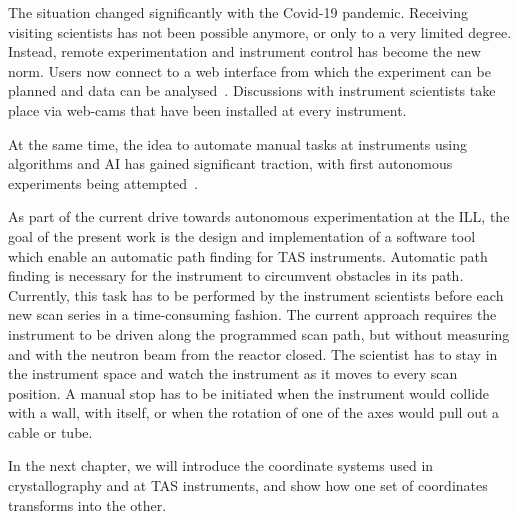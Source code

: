 The situation changed significantly with the Covid-19 pandemic. Receiving visiting scientists has not been possible anymore, or only to a very limited degree. Instead, remote experimentation and instrument control has become the new norm. Users now connect to a web interface from which the experiment can be planned and data can be analysed~\cite{web_ill_visa}. Discussions with instrument scientists take place via web-cams that have been installed at every instrument.

At the same time, the idea to automate manual tasks at instruments using algorithms and AI has gained significant traction, with first autonomous experiments being attempted~\cite{web_ill_autonomous2020, Noack2021}.

As part of the current drive towards autonomous experimentation at the ILL, the goal of the present work is the design and implementation of a software tool which enable an automatic path finding for TAS instruments. Automatic path finding is necessary for the instrument to circumvent obstacles in its path. Currently, this task has to be performed by the instrument scientists before each new scan series in a time-consuming fashion. The current approach requires the instrument to be  driven along the programmed scan path, but without measuring and with the neutron beam from the reactor closed. The scientist has to stay in the instrument space and watch the instrument as it moves to every scan position. A manual stop has to be initiated when the instrument would collide with a wall, with itself, or when the rotation of one of the axes would pull out a cable or tube.

In the next chapter, we will introduce the coordinate systems used in crystallography and at TAS instruments, and show how one set of coordinates transforms into the other.
